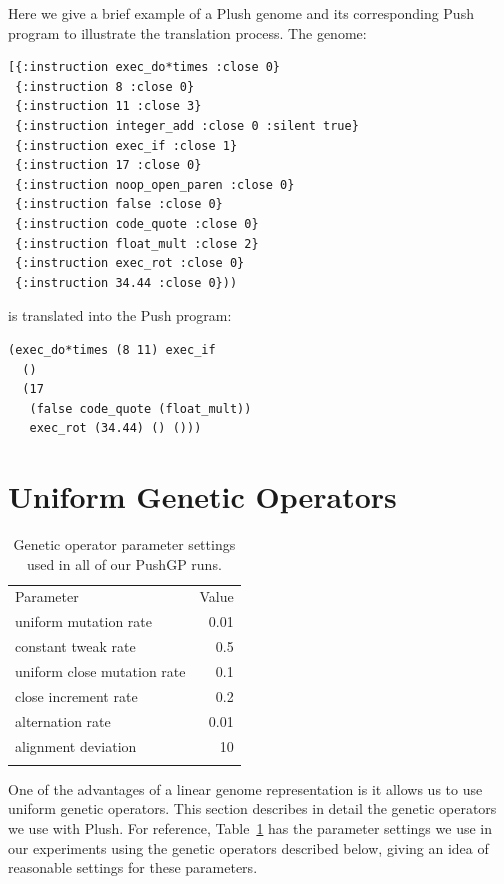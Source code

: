 \documentclass[graybox]{svmult}
\begin{document}
Here we give a brief example of a Plush genome and its corresponding Push program to illustrate the translation process. The genome:
\begin{verbatim}
[{:instruction exec_do*times :close 0}
 {:instruction 8 :close 0}
 {:instruction 11 :close 3}
 {:instruction integer_add :close 0 :silent true}
 {:instruction exec_if :close 1}
 {:instruction 17 :close 0}
 {:instruction noop_open_paren :close 0}
 {:instruction false :close 0}
 {:instruction code_quote :close 0}
 {:instruction float_mult :close 2}
 {:instruction exec_rot :close 0}
 {:instruction 34.44 :close 0}))
\end{verbatim}
is translated into the Push program:
\begin{verbatim}
(exec_do*times (8 11) exec_if
  ()
  (17
   (false code_quote (float_mult))
   exec_rot (34.44) () ()))
\end{verbatim}


\section{Uniform Genetic Operators}
\label{section:genetic-operators}

\begin{table}[t]
\centering
\caption{Genetic operator parameter settings used in all of our PushGP runs.}
\label{tableGPconstantParams}
\begin{tabular}{l r}
\hline\noalign{\smallskip}
Parameter & Value \tabularnewline
\noalign{\smallskip}\svhline\noalign{\smallskip}
uniform mutation rate & 0.01 \tabularnewline
constant tweak rate & 0.5 \\
uniform close mutation rate & 0.1 \tabularnewline
close increment rate & 0.2 \\
alternation rate & 0.01 \tabularnewline
alignment deviation & 10 \tabularnewline
\noalign{\smallskip}\hline\noalign{\smallskip}
\end{tabular}
\end{table}

One of the advantages of a linear genome representation is it allows us to use uniform genetic operators. This section describes in detail the genetic operators we use with Plush. For reference, Table~\ref{tableGPconstantParams} has the parameter settings we use in our experiments using the genetic operators described below, giving an idea of reasonable settings for these parameters.
\end{document}
